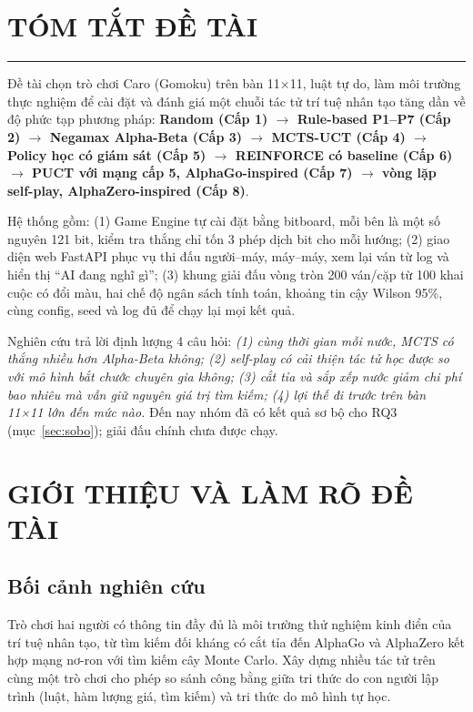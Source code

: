 \documentclass[12pt,a4paper]{report}
\begin{document}
\section*{TÓM TẮT ĐỀ TÀI}
\hrule\vspace{4pt}

Đề tài chọn trò chơi Caro (Gomoku) trên bàn 11×11, luật tự do, làm môi trường thực nghiệm để cài đặt và đánh giá một chuỗi tác tử trí tuệ nhân tạo tăng dần về độ phức tạp phương pháp:
\textbf{Random (Cấp 1) $\rightarrow$ Rule-based P1--P7 (Cấp 2) $\rightarrow$ Negamax Alpha-Beta (Cấp 3) $\rightarrow$ MCTS-UCT (Cấp 4) $\rightarrow$ Policy học có giám sát (Cấp 5) $\rightarrow$ REINFORCE có baseline (Cấp 6) $\rightarrow$ PUCT với mạng cấp 5, AlphaGo-inspired (Cấp 7) $\rightarrow$ vòng lặp self-play, AlphaZero-inspired (Cấp 8)}.

Hệ thống gồm: (1) Game Engine tự cài đặt bằng bitboard, mỗi bên là một số nguyên 121 bit, kiểm tra thắng chỉ tốn 3 phép dịch bit cho mỗi hướng; (2) giao diện web FastAPI phục vụ thi đấu người--máy, máy--máy, xem lại ván từ log và hiển thị ``AI đang nghĩ gì''; (3) khung giải đấu vòng tròn 200 ván/cặp từ 100 khai cuộc có đổi màu, hai chế độ ngân sách tính toán, khoảng tin cậy Wilson 95\%, cùng config, seed và log đủ để chạy lại mọi kết quả.

Nghiên cứu trả lời định lượng 4 câu hỏi: \textit{(1) cùng thời gian mỗi nước, MCTS có thắng nhiều hơn Alpha-Beta không; (2) self-play có cải thiện tác tử học được so với mô hình bắt chước chuyên gia không; (3) cắt tỉa và sắp xếp nước giảm chi phí bao nhiêu mà vẫn giữ nguyên giá trị tìm kiếm; (4) lợi thế đi trước trên bàn 11×11 lớn đến mức nào.} Đến nay nhóm đã có kết quả sơ bộ cho RQ3 (mục~\ref{sec:sobo}); giải đấu chính chưa được chạy.

\section{GIỚI THIỆU VÀ LÀM RÕ ĐỀ TÀI}

\subsection{Bối cảnh nghiên cứu}
Trò chơi hai người có thông tin đầy đủ là môi trường thử nghiệm kinh điển của trí tuệ nhân tạo, từ tìm kiếm đối kháng có cắt tỉa \cite{russell2021aima,knuth1975alphabeta} đến AlphaGo \cite{silver2016alphago} và AlphaZero \cite{silver2018alphazero} kết hợp mạng nơ-ron với tìm kiếm cây Monte Carlo. Xây dựng nhiều tác tử trên cùng một trò chơi cho phép so sánh công bằng giữa tri thức do con người lập trình (luật, hàm lượng giá, tìm kiếm) và tri thức do mô hình tự học.
\end{document}
